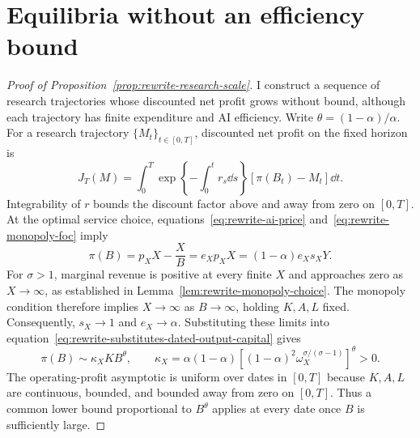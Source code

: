 \section{Equilibria without an efficiency bound}
\label{app:rewrite-uncapped-proofs}



\begin{proof}[Proof of Proposition~\ref{prop:rewrite-research-scale}]
\label{proof:rewrite-research-scale}
I construct a sequence of research trajectories whose discounted net profit
grows without bound, although each trajectory has finite expenditure and
AI efficiency. Write $\theta=(1-\alpha)/\alpha$. For a research trajectory
$\{M_t\}_{t\in[0,T]}$, discounted net profit on the fixed horizon is
\[
 J_T(M)=\int_0^T
 \exp\left\{-\int_0^t r_s\dd s\right\}
 [\pi(B_t)-M_t]\dd t.
\]
Integrability of $r$ bounds the discount factor above and away from zero
on $[0,T]$.
At the optimal service choice, equations~\eqref{eq:rewrite-ai-price}
and~\eqref{eq:rewrite-monopoly-foc} imply
\[
 \pi(B)=p_XX-\frac XB
 =e_Xp_XX=(1-\alpha)e_Xs_XY.
\]
For $\sigma>1$, marginal revenue is positive at every finite $X$
and approaches zero as $X\to\infty$, as established in
Lemma~\ref{lem:rewrite-monopoly-choice}. The monopoly condition
therefore implies $X\to\infty$ as $B\to\infty$, holding $K,A,L$
fixed. Consequently, $s_X\to1$ and $e_X\to\alpha$.
Substituting these limits into
equation~\eqref{eq:rewrite-substitutes-dated-output-capital} gives
\[
 \pi(B)\sim\kappa_XKB^\theta,\qquad
 \kappa_X=\alpha(1-\alpha)
 \left[(1-\alpha)^2\omega_X^{\sigma/(\sigma-1)}\right]^\theta>0.
\]
The operating-profit asymptotic is uniform over dates in $[0,T]$ because
$K,A,L$ are continuous, bounded, and bounded away from zero
on $[0,T]$. Thus a common lower bound proportional to $B^\theta$ applies
at every date once $B$ is sufficiently large.


\end{proof}
